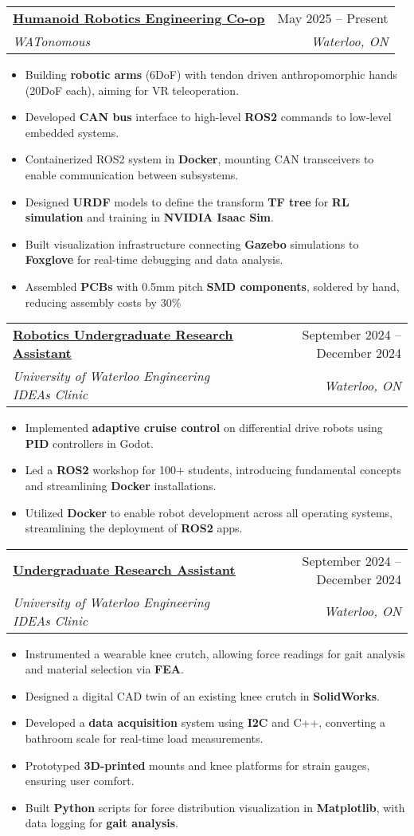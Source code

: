 \documentclass[letterpaper]{article}
\makeatletter
\newcommand{\resumeItem}[1]{
  \item\small{
    {#1 \vspace{-2pt}}
  }
}
\newcommand{\resumeSubheading}[4]{
  \vspace{-2pt}\item
    \begin{tabular*}{0.97\textwidth}[t]{l@{\extracolsep{\fill}}r}
      \textbf{#1} & #2 \\
      \textit{\small#3} & \textit{\small #4} \\
    \end{tabular*}\vspace{-7pt}
}
\newcommand{\resumeItemListStart}{\begin{itemize}}
\newcommand{\resumeItemListEnd}{\end{itemize}\vspace{-5pt}}
\makeatother
\begin{document}
\resumeSubheading
  {\href{https://gavintranquilino.com/wato-humanoid/}{\underline{Humanoid Robotics Engineering Co-op}}}{May 2025 -- Present}
  {WATonomous}{Waterloo, ON}
  \resumeItemListStart
    \resumeItem{Building \textbf{robotic arms} (6DoF) with tendon driven anthropomorphic hands (20DoF each), aiming for VR teleoperation.}
    \resumeItem{Developed \textbf{CAN bus} interface to high-level \textbf{ROS2} commands to low-level embedded systems.}
    \resumeItem{Containerized ROS2 system in \textbf{Docker}, mounting CAN transceivers to enable communication between subsystems.}
    \resumeItem{Designed \textbf{URDF} models to define the transform \textbf{TF tree} for \textbf{RL simulation} and training in \textbf{NVIDIA Isaac Sim}.}
    \resumeItem{Built visualization infrastructure connecting \textbf{Gazebo} simulations to \textbf{Foxglove} for real-time debugging and data analysis.}
    \resumeItem{Assembled \textbf{PCBs} with 0.5mm pitch \textbf{SMD components}, soldered by hand, reducing assembly costs by 30\%}
  \resumeItemListEnd

\resumeSubheading
  {\href{https://gavintranquilino.com/se-380/}{\underline{Robotics Undergraduate Research Assistant}}}{September 2024 -- December 2024}
  {University of Waterloo Engineering IDEAs Clinic}{Waterloo, ON}
  \resumeItemListStart
    \resumeItem{Implemented \textbf{adaptive cruise control} on differential drive robots using \textbf{PID} controllers in Godot.}
    \resumeItem{Led a \textbf{ROS2} workshop for 100+ students, introducing fundamental concepts and streamlining \textbf{Docker} installations.}
    \resumeItem{Utilized \textbf{Docker} to enable robot development across all operating systems, streamlining the deployment of \textbf{ROS2} apps.}
  \resumeItemListEnd

\resumeSubheading
  {\href{https://www.gavintranquilino.com/ideas-clinic.html}{\underline{Undergraduate Research Assistant}}}{September 2024 -- December 2024}
  {University of Waterloo Engineering IDEAs Clinic}{Waterloo, ON}
  \resumeItemListStart
    \resumeItem{Instrumented a wearable knee crutch, allowing force readings for gait analysis and material selection via \textbf{FEA}.}
    \resumeItem{Designed a digital CAD twin of an existing knee crutch in \textbf{SolidWorks}.}
    \resumeItem{Developed a \textbf{data acquisition} system using \textbf{I2C} and C++, converting a bathroom scale for real-time load measurements.}
    \resumeItem{Prototyped \textbf{3D-printed} mounts and knee platforms for strain gauges, ensuring user comfort.}
    \resumeItem{Built \textbf{Python} scripts for force distribution visualization in \textbf{Matplotlib}, with data logging for \textbf{gait analysis}.}
  \resumeItemListEnd
\end{document}
